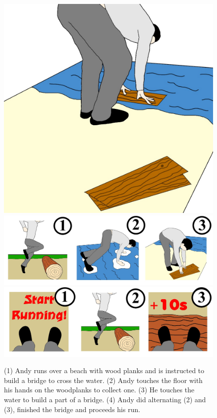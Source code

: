 \documentclass[twocolumn,showpacs,%
  nofootinbib,aps,superscriptaddress,%
  eqsecnum,prd,notitlepage,showkeys,10pt]{revtex4-1}
\begin{document}
\begin{figure}[!htb]
  \includegraphics[width=\linewidth]{graphics/Image(10).jpg}
\endminipage\hfill
{}
  \includegraphics[width=\linewidth]{graphics/Image(11).jpg}
\endminipage\hfill
{}%
  \includegraphics[width=\linewidth]{graphics/Image(12).jpg}
\endminipage
  \caption{(1) Andy runs over a beach with wood planks and is instructed to build a bridge to cross the water. (2) Andy touches the floor with his hands on the woodplanks to collect one. (3) He touches the water to build a part of a bridge. (4) Andy did alternating (2) and (3), finished the bridge and proceeds his run.}\label{fig:awesome_image3}
\end{figure}
\end{document}
